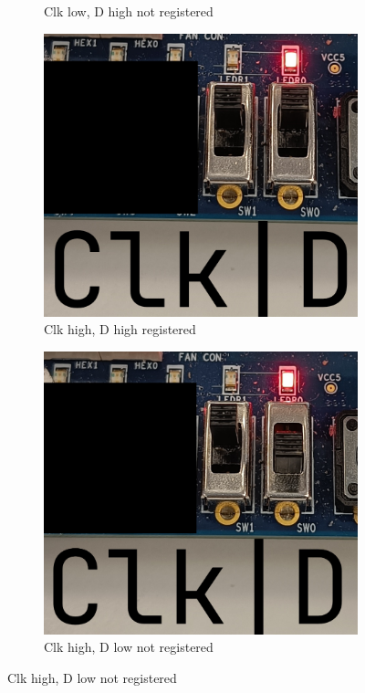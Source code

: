 \documentclass{article}
\begin{document}
\begin{figure}[h]
\begin{subfigure}[t]{0.45\textwidth}
        \caption{Clk low, D high not registered}
        \label{fig:p3_2}
    \end{subfigure}
    
    \begin{subfigure}[t]{0.45\textwidth}
        \centering
        \includegraphics[width=1\textwidth]{Figures/Part3_3.jpg}
        \caption{Clk high, D high registered}
        \label{fig:p3_3}
    \end{subfigure}
    \hfill
    \begin{subfigure}[t]{0.45\textwidth}
        \centering
        \includegraphics[width=1\textwidth]{Figures/Part3_4.jpg}
        \caption{Clk high, D low not registered}
        \label{fig:p3_4}
    \end{subfigure}
    

\end{figure}
\end{document}
